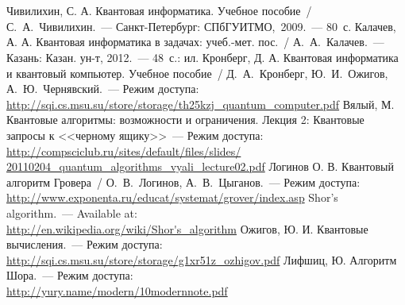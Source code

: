 \documentclass[pscyr,notitlepage]{hedwork}
\renewcommand{\~}[1]{\widetilde{#1}}
\begin{document}
  \section*{} \vspace{-2em}
  \begin{thebibliography}{10}
     Чивилихин, С. А. Квантовая информатика. Учебное пособие~/
      С.~А.~Чивилихин.~--- Санкт-Петербург: СПбГУИТМО,~2009.~--- 80~с.
     Калачев, А. А. Квантовая информатика в задачах:
      учеб.-мет. пос.~/ А.~А.~Калачев.~--- Казань: Казан. ун-т, 2012.~---
      48~с.: ил.
     Кронберг, Д. А. Квантовая информатика и квантовый
      компьютер. Учебное пособие~/ Д.~А.~Кронберг, Ю.~И.~Ожигов,
      А.~Ю.~Чернявский.~--- Режим доступа:
      \url{http://sqi.cs.msu.su/store/storage/th25kzj_quantum_computer.pdf}
     Вялый, М. Квантовые алгоритмы: возможности и ограничения.
      Лекция 2: Квантовые запросы к <<черному ящику>>~---
      Режим доступа:\\
      \url{http://compsciclub.ru/sites/default/files/slides/
        20110204_quantum_algorithms_vyali_lecture02.pdf}
     Логинов О. В. Квантовый алгоритм Гровера~/
      О.~В.~Логинов, А.~В.~Цыганов.~--- Режим доступа:\\
      \url{http://www.exponenta.ru/educat/systemat/grover/index.asp}
     Shor's algorithm.~--- Available at:\\
      \url{http://en.wikipedia.org/wiki/Shor's_algorithm}
     Ожигов, Ю. И. Квантовые вычисления.~--- Режим доступа:\\
      \url{http://sqi.cs.msu.su/store/storage/g1xr51z_ozhigov.pdf}
     Лифшиц, Ю. Алгоритм Шора.~--- Режим доступа:\\
      \url{http://yury.name/modern/10modernnote.pdf}
  \end{thebibliography}
\end{document}
